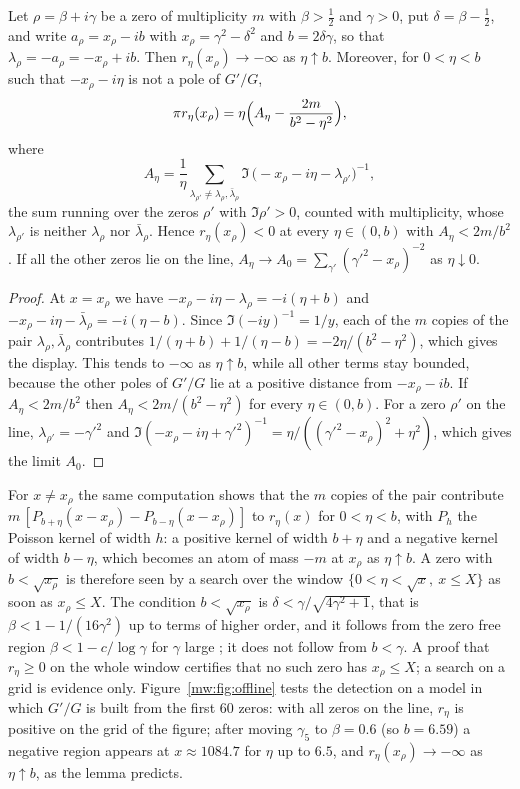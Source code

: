 \begin{lemma}[Detection]\label{mw:lem:detect}
Let $\rho=\beta+i\gamma$ be a zero of multiplicity $m$ with $\beta>\frac12$ and $\gamma>0$, put $\delta=\beta-\frac12$, and write $a_\rho=x_\rho-ib$ with $x_\rho=\gamma^2-\delta^2$ and $b=2\delta\gamma$, so that $\lambda_\rho=-a_\rho=-x_\rho+ib$. Then $r_\eta(x_\rho)\to-\infty$ as $\eta\uparrow b$. Moreover, for $0<\eta<b$ such that $-x_\rho-i\eta$ is not a pole of $G'/G$,
\[
\pi r_\eta(x_\rho)=\eta\Bigl(A_\eta-\frac{2m}{b^2-\eta^2}\Bigr),
\]
where
\[
A_\eta=\frac1\eta\sum_{\lambda_{\rho'}\ne\lambda_\rho,\bar\lambda_\rho}\Im\,\bigl(-x_\rho-i\eta-\lambda_{\rho'}\bigr)^{-1},
\]
the sum running over the zeros $\rho'$ with $\Im\rho'>0$, counted with multiplicity, whose $\lambda_{\rho'}$ is neither $\lambda_\rho$ nor $\bar\lambda_\rho$. Hence $r_\eta(x_\rho)<0$ at every $\eta\in(0,b)$ with $A_\eta<2m/b^2$. If all the other zeros lie on the line, $A_\eta\to A_0=\sum_{\gamma'}(\gamma'^2-x_\rho)^{-2}$ as $\eta\downarrow0$.
\end{lemma}

\begin{proof}
At $x=x_\rho$ we have $-x_\rho-i\eta-\lambda_\rho=-i(\eta+b)$ and $-x_\rho-i\eta-\bar\lambda_\rho=-i(\eta-b)$. Since $\Im(-iy)^{-1}=1/y$, each of the $m$ copies of the pair $\lambda_\rho,\bar\lambda_\rho$ contributes $1/(\eta+b)+1/(\eta-b)=-2\eta/(b^2-\eta^2)$, which gives the display. This tends to $-\infty$ as $\eta\uparrow b$, while all other terms stay bounded, because the other poles of $G'/G$ lie at a positive distance from $-x_\rho-ib$. If $A_\eta<2m/b^2$ then $A_\eta<2m/(b^2-\eta^2)$ for every $\eta\in(0,b)$. For a zero $\rho'$ on the line, $\lambda_{\rho'}=-\gamma'^2$ and $\Im(-x_\rho-i\eta+\gamma'^2)^{-1}=\eta/((\gamma'^2-x_\rho)^2+\eta^2)$, which gives the limit $A_0$.
\end{proof}

For $x\ne x_\rho$ the same computation shows that the $m$ copies of the pair contribute $m\,[P_{b+\eta}(x-x_\rho)-P_{b-\eta}(x-x_\rho)]$ to $r_\eta(x)$ for $0<\eta<b$, with $P_h$ the Poisson kernel of width $h$: a positive kernel of width $b+\eta$ and a negative kernel of width $b-\eta$, which becomes an atom of mass $-m$ at $x_\rho$ as $\eta\uparrow b$. A zero with $b<\sqrt{x_\rho}$ is therefore seen by a search over the window $\{0<\eta<\sqrt x,\ x\le X\}$ as soon as $x_\rho\le X$. The condition $b<\sqrt{x_\rho}$ is $\delta<\gamma/\sqrt{4\gamma^2+1}$, that is $\beta<1-1/(16\gamma^2)$ up to terms of higher order, and it follows from the zero free region $\beta<1-c/\log\gamma$ for $\gamma$ large \cite[Theorem 3.8]{Titchmarsh}; it does not follow from $b<\gamma$. A proof that $r_\eta\ge0$ on the whole window certifies that no such zero has $x_\rho\le X$; a search on a grid is evidence only. Figure~\ref{mw:fig:offline} tests the detection on a model in which $G'/G$ is built from the first 60 zeros: with all zeros on the line, $r_\eta$ is positive on the grid of the figure; after moving $\gamma_5$ to $\beta=0.6$ (so $b=6.59$) a negative region appears at $x\approx1084.7$ for $\eta$ up to $6.5$, and $r_\eta(x_\rho)\to-\infty$ as $\eta\uparrow b$, as the lemma predicts.

